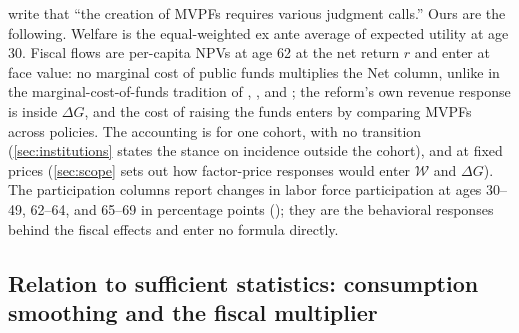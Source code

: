 \citet{hendren2020unified} write that ``the creation of MVPFs requires various judgment calls.'' Ours are the following.
Welfare is the equal-weighted ex ante average of expected utility at age 30. Fiscal flows are per-capita NPVs at age 62 at the net return $r$ and enter at face value: no marginal cost of public funds multiplies the Net column, unlike in the marginal-cost-of-funds tradition of \citet{mayshar1990measures}, \citet{slemrod1996costs}, and \citet{kleven2006marginal}; the reform's own revenue response is inside $\Delta G$, and the cost of raising the funds enters by comparing MVPFs across policies. The accounting is for one cohort, with no transition (\autoref{sec:institutions} states the stance on incidence outside the cohort), and at fixed prices (\autoref{sec:scope} sets out how factor-price responses would enter $\mathcal{W}$ and $\Delta G$). The participation columns report changes in labor force participation at ages 30--49, 62--64, and 65--69 in percentage points (\pp); they are the behavioral responses behind the fiscal effects and enter no formula directly.

\subsection{Relation to sufficient statistics: consumption smoothing and the fiscal multiplier}\label{sec:suffstats}

